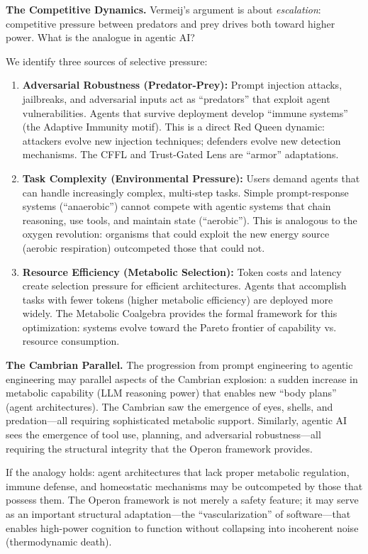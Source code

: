 \textbf{The Competitive Dynamics.} Vermeij's argument is about \textit{escalation}: competitive pressure
between predators and prey drives both toward higher power. What is the analogue in agentic AI?

We identify three sources of selective pressure:
\begin{enumerate}[leftmargin=*]
\item \textbf{Adversarial Robustness (Predator-Prey):} Prompt injection attacks, jailbreaks, and adversarial
inputs act as ``predators'' that exploit agent vulnerabilities. Agents that survive deployment develop
``immune systems'' (the Adaptive Immunity motif). This is a direct Red Queen dynamic: attackers evolve new
injection techniques; defenders evolve new detection mechanisms. The CFFL and Trust-Gated Lens are
``armor'' adaptations.

\item \textbf{Task Complexity (Environmental Pressure):} Users demand agents that can handle increasingly
complex, multi-step tasks. Simple prompt-response systems (``anaerobic'') cannot compete with agentic
systems that chain reasoning, use tools, and maintain state (``aerobic''). This is analogous to the
oxygen revolution: organisms that could exploit the new energy source (aerobic respiration) outcompeted
those that could not.

\item \textbf{Resource Efficiency (Metabolic Selection):} Token costs and latency create selection pressure
for efficient architectures. Agents that accomplish tasks with fewer tokens (higher metabolic efficiency)
are deployed more widely. The Metabolic Coalgebra provides the formal framework for this optimization:
systems evolve toward the Pareto frontier of capability vs. resource consumption.
\end{enumerate}

\textbf{The Cambrian Parallel.} The progression from prompt engineering to agentic engineering may parallel aspects of the
Cambrian explosion: a sudden increase in metabolic capability (LLM reasoning power) that enables new
``body plans'' (agent architectures). The Cambrian saw the emergence of eyes, shells, and predation---all
requiring sophisticated metabolic support. Similarly, agentic AI sees the emergence of tool use, planning,
and adversarial robustness---all requiring the structural integrity that the Operon framework provides.

If the analogy holds: agent architectures that lack proper metabolic regulation, immune defense, and
homeostatic mechanisms may be outcompeted by those that possess them. The Operon framework is not merely
a safety feature; it may serve as an important structural adaptation---the ``vascularization'' of software---that
enables high-power cognition to function without collapsing into incoherent noise (thermodynamic death).

